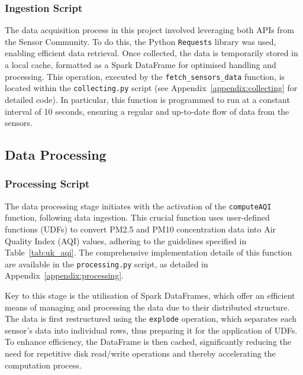 \documentclass[12pt,oneside]{book} %
\begin{document}
\subsubsection{Ingestion Script}
The data acquisition process in this project involved leveraging both APIs from
the Sensor Community. To do this, the Python \texttt{Requests} library was
used, enabling efficient data retrieval. Once collected, the data is
temporarily stored in a local cache, formatted as a Spark DataFrame for
optimised handling and processing. This operation, executed by the
\texttt{fetch\_sensors\_data} function, is located within the
\texttt{collecting.py} script (see Appendix~\ref{appendix:collecting} for
detailed code). In particular, this function is programmed to run at a constant
interval of 10 seconds, ensuring a regular and up-to-date flow of data from the
sensors.

\subsection{Data Processing}

\subsubsection{Processing Script}
The data processing stage initiates with the activation of the
\texttt{computeAQI} function, following data ingestion. This crucial function
uses user-defined functions (UDFs) to convert PM2.5 and PM10 concentration data
into Air Quality Index (AQI) values, adhering to the guidelines specified in
Table~\ref{tab:uk_aqi}. The comprehensive implementation details of this
function are available in the \texttt{processing.py} script, as detailed in
Appendix~\ref{appendix:processing}.

Key to this stage is the utilisation of Spark DataFrames, which offer an
efficient means of managing and processing the data due to their distributed
structure. The data is first restructured using the \texttt{explode} operation,
which separates each sensor's data into individual rows, thus preparing it for
the application of UDFs. To enhance efficiency, the DataFrame is then cached,
significantly reducing the need for repetitive disk read/write operations and
thereby accelerating the computation process.
\end{document}
